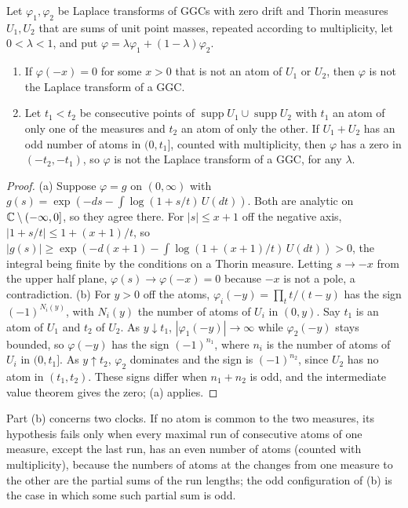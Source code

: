 \begin{proposition}\label{gl:prop:mixture}
Let $\varphi_1,\varphi_2$ be Laplace transforms of GGCs with zero drift and Thorin measures $U_1,U_2$ that are sums of unit point masses, repeated according to multiplicity, let $0<\lambda<1$, and put $\varphi=\lambda\varphi_1+(1-\lambda)\varphi_2$.
\begin{enumerate}
\item[(a)] If $\varphi(-x)=0$ for some $x>0$ that is not an atom of $U_1$ or $U_2$, then $\varphi$ is not the Laplace transform of a GGC.
\item[(b)] Let $t_1<t_2$ be consecutive points of $\operatorname{supp}U_1\cup\operatorname{supp}U_2$ with $t_1$ an atom of only one of the measures and $t_2$ an atom of only the other. If $U_1+U_2$ has an odd number of atoms in $(0,t_1]$, counted with multiplicity, then $\varphi$ has a zero in $(-t_2,-t_1)$, so $\varphi$ is not the Laplace transform of a GGC, for any $\lambda$.
\end{enumerate}
\end{proposition}

\begin{proof}
(a) Suppose $\varphi=g$ on $(0,\infty)$ with $g(s)=\exp(-ds-\int\log(1+s/t)\,U(dt))$. Both are analytic on $\mathbb{C}\setminus(-\infty,0]$, so they agree there. For $|s|\le x+1$ off the negative axis, $|1+s/t|\le1+(x+1)/t$, so $|g(s)|\ge\exp(-d(x+1)-\int\log(1+(x+1)/t)\,U(dt))>0$, the integral being finite by the conditions on a Thorin measure. Letting $s\to-x$ from the upper half plane, $\varphi(s)\to\varphi(-x)=0$ because $-x$ is not a pole, a contradiction. (b) For $y>0$ off the atoms, $\varphi_i(-y)=\prod_tt/(t-y)$ has the sign $(-1)^{N_i(y)}$, with $N_i(y)$ the number of atoms of $U_i$ in $(0,y)$. Say $t_1$ is an atom of $U_1$ and $t_2$ of $U_2$. As $y\downarrow t_1$, $|\varphi_1(-y)|\to\infty$ while $\varphi_2(-y)$ stays bounded, so $\varphi(-y)$ has the sign $(-1)^{n_1}$, where $n_i$ is the number of atoms of $U_i$ in $(0,t_1]$. As $y\uparrow t_2$, $\varphi_2$ dominates and the sign is $(-1)^{n_2}$, since $U_2$ has no atom in $(t_1,t_2)$. These signs differ when $n_1+n_2$ is odd, and the intermediate value theorem gives the zero; (a) applies.
\end{proof}

Part (b) concerns two clocks. If no atom is common to the two measures, its hypothesis fails only when every maximal run of consecutive atoms of one measure, except the last run, has an even number of atoms (counted with multiplicity), because the numbers of atoms at the changes from one measure to the other are the partial sums of the run lengths; the odd configuration of (b) is the case in which some such partial sum is odd.


